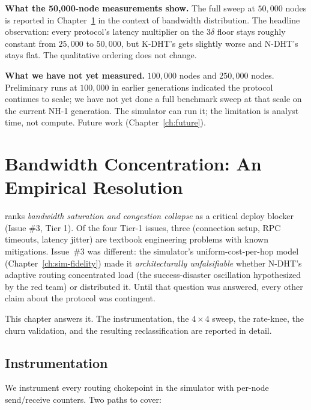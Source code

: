 \documentclass[twoside,nobib]{tufte-book}
\newcommand{\NDHT}{N-DHT\xspace}
\newcommand{\KDHT}{K-DHT\xspace}
\begin{document}
\textbf{What the 50,000-node measurements show.} The full sweep
at $50{,}000$ nodes is reported in Chapter~\ref{ch:eval-bandwidth}
in the context of bandwidth distribution. The headline
observation: every protocol's latency multiplier on the
$3\delta$ floor stays roughly constant from $25{,}000$ to
$50{,}000$, but \KDHT's gets slightly worse and \NDHT's stays
flat. The qualitative ordering does not change.

\textbf{What we have not yet measured.} $100{,}000$ nodes and
$250{,}000$ nodes. Preliminary runs at $100{,}000$ in earlier
generations indicated the protocol continues to scale; we have
not yet done a full benchmark sweep at that scale on the current
NH-1 generation. The simulator can run it; the limitation is
analyst time, not compute. Future work
(Chapter~\ref{ch:future}).


\chapter{Bandwidth Concentration: An Empirical Resolution}
\label{ch:eval-bandwidth}

 ranks
\emph{bandwidth saturation and congestion collapse} as a
critical deploy blocker (Issue \#3, Tier 1). Of the four Tier-1
issues, three (connection setup, RPC timeouts, latency jitter)
are textbook engineering problems with known mitigations.
Issue~\#3 was different: the simulator's uniform-cost-per-hop
model (Chapter~\ref{ch:sim-fidelity}) made it
\emph{architecturally unfalsifiable} whether \NDHT's adaptive
routing concentrated load (the success-disaster oscillation
hypothesized by the red team) or distributed it. Until that
question was answered, every other claim about the protocol
was contingent.

This chapter answers it. The instrumentation, the $4 \times 4$
sweep, the rate-knee, the churn validation, and the resulting
reclassification are reported in detail.

\section{Instrumentation}

We instrument every routing chokepoint in the simulator with
per-node send/receive counters. Two paths to cover:
\end{document}

